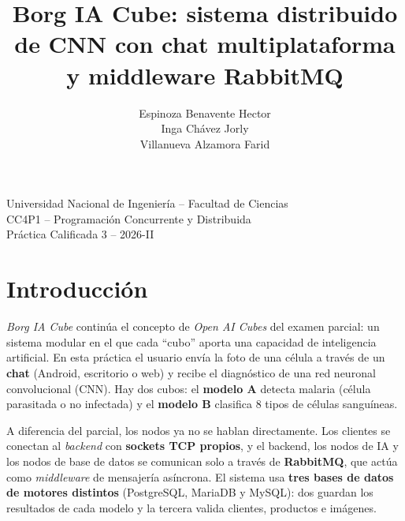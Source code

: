 \documentclass[10pt,a4paper]{article}
\begin{document}
\title{\textbf{Borg IA Cube: sistema distribuido de CNN con chat multiplataforma y middleware RabbitMQ}}

\author{
Espinoza Benavente Hector \\
Inga Chávez Jorly \\
Villanueva Alzamora Farid
}

\date{}
\maketitle

\begin{center}
Universidad Nacional de Ingeniería -- Facultad de Ciencias\\[4pt]
CC4P1 -- Programación Concurrente y Distribuida\\
Práctica Calificada 3 -- 2026-II
\end{center}

\vspace{10pt}
\setcounter{tocdepth}{2}
\tableofcontents
\newpage

\section{Introducción}

\textit{Borg IA Cube} continúa el concepto de \textit{Open AI Cubes} del examen parcial: un sistema
modular en el que cada \textquotedblleft{}cubo\textquotedblright{} aporta una capacidad de inteligencia
artificial. En esta práctica el usuario envía la foto de una célula a través de un \textbf{chat}
(Android, escritorio o web) y recibe el diagnóstico de una red neuronal convolucional (CNN). Hay dos
cubos: el \textbf{modelo A} detecta malaria (célula parasitada o no infectada) y el \textbf{modelo B}
clasifica 8 tipos de células sanguíneas.

A diferencia del parcial, los nodos ya no se hablan directamente. Los clientes se conectan al
\textit{backend} con \textbf{sockets TCP propios}, y el backend, los nodos de IA y los nodos de base de
datos se comunican solo a través de \textbf{RabbitMQ}, que actúa como \textit{middleware} de mensajería
asíncrona. El sistema usa \textbf{tres bases de datos de motores distintos} (PostgreSQL, MariaDB y
MySQL): dos guardan los resultados de cada modelo y la tercera valida clientes, productos e imágenes.
\end{document}
